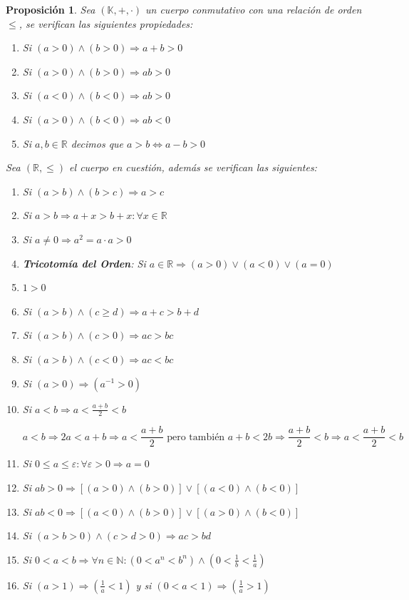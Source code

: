 \documentclass[10pt,a4paper,openright]{book}
\theoremstyle{break}
\newtheorem{prop}{Proposición}[chapter]
\begin{document}
\begin{prop}
Sea $(\mathbb K, +, \cdot)$ un cuerpo conmutativo con una relación de orden $\leq$, se verifican las siguientes propiedades:
\begin{enumerate}
\item Si $(a>0) \wedge (b>0)\Rightarrow a+b>0$
\item Si $(a>0)\wedge (b>0)\Rightarrow ab>0$
\item Si $(a<0)\wedge (b<0)\Rightarrow ab>0$
\item Si $(a>0)\wedge (b<0)\Rightarrow ab<0$
\item Si $a,b\in \mathbb R$ decimos que $a>b\Leftrightarrow a-b>0$
\end{enumerate}
Sea $(\mathbb R, \leq)$ el cuerpo en cuestión, además se verifican las siguientes:
\begin{enumerate}
\item Si $(a>b)\wedge (b>c)\Rightarrow a>c$
\item Si $a>b\Rightarrow a+x>b+x: \forall x\in \mathbb R$
\item Si $a\neq 0\Rightarrow a^2=a\cdot a>0$
\item \textbf{Tricotomía del Orden}: Si $a\in \mathbb R\Rightarrow (a>0)\vee (a<0)\vee (a=0)$
\item $1>0$
\item Si $(a>b) \wedge (c\geq d)\Rightarrow a+c>b+d$
\item Si $(a>b) \wedge (c>0)\Rightarrow ac>bc$
\item Si $(a>b)\wedge (c<0)\Rightarrow ac<bc$
\item Si $(a>0)\Rightarrow (a^{-1}>0)$
\item Si $a<b\Rightarrow a<\frac{a+b}{2}<b$\par
$$
a<b\Rightarrow 2a<a+b \Rightarrow a<\frac{a+b}{2}\mbox{ pero también }a+b<2b\Rightarrow \frac{a+b}{2}<b \Rightarrow a<\frac{a+b}{2}<b
$$
\item Si $0\leq a\leq \varepsilon: \forall \varepsilon>0 \Rightarrow a=0$
\item Si $ab>0\Rightarrow [(a>0)\wedge (b>0)]\vee [(a<0)\wedge (b<0)]$
\item Si $ab<0\Rightarrow [(a<0)\wedge (b>0)]\vee [(a>0)\wedge (b<0)]$
\item Si $(a>b>0)\wedge (c>d>0)\Rightarrow ac>bd$
\item Si $0<a<b\Rightarrow \forall n \in \mathbb N : (0<a^n<b^n)\wedge (0<\frac{1}{b}<\frac{1}{a})$
\item Si $(a>1)\Rightarrow (\frac{1}{a}<1)$ y si $(0<a<1)\Rightarrow (\frac{1}{a}>1)$
\end{enumerate}
\end{prop}
\end{document}
